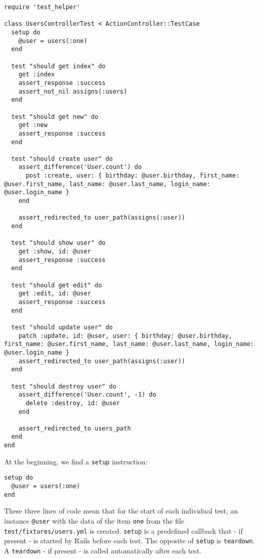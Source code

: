 \documentclass[a4paper]{book}
\begin{document}
\begin{shaded}\begin{verbatim}
require 'test_helper'

class UsersControllerTest < ActionController::TestCase
  setup do
    @user = users(:one)
  end

  test "should get index" do
    get :index
    assert_response :success
    assert_not_nil assigns(:users)
  end

  test "should get new" do
    get :new
    assert_response :success
  end

  test "should create user" do
    assert_difference('User.count') do
      post :create, user: { birthday: @user.birthday, first_name: @user.first_name, last_name: @user.last_name, login_name: @user.login_name }
    end

    assert_redirected_to user_path(assigns(:user))
  end

  test "should show user" do
    get :show, id: @user
    assert_response :success
  end

  test "should get edit" do
    get :edit, id: @user
    assert_response :success
  end

  test "should update user" do
    patch :update, id: @user, user: { birthday: @user.birthday, first_name: @user.first_name, last_name: @user.last_name, login_name: @user.login_name }
    assert_redirected_to user_path(assigns(:user))
  end

  test "should destroy user" do
    assert_difference('User.count', -1) do
      delete :destroy, id: @user
    end

    assert_redirected_to users_path
  end
end
\end{verbatim}\end{shaded}

At the beginning, we find a \texttt{setup} instruction:

\begin{shaded}\begin{verbatim}
setup do
  @user = users(:one)
end
\end{verbatim}\end{shaded}

These three lines of code mean that for the start of each individual test, an instance \texttt{@user} with the data of the item \texttt{one} from the file \texttt{test/fixtures/users.yml} is created. \texttt{setup} is a predefined callback that - if present - is started by Rails before each test. The opposite of \texttt{setup} is \texttt{teardown}. A \texttt{teardown} - if present - is called automatically after each test.
\end{document}
